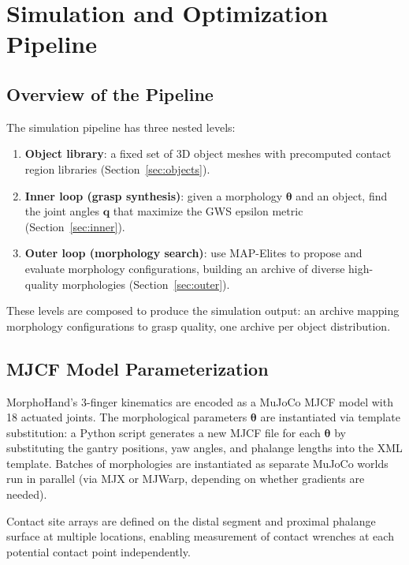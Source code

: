 \documentclass[journal]{IEEEtran}
\newcommand{\btheta}{\boldsymbol{\theta}}
\newcommand{\bq}{\mathbf{q}}
\begin{document}
\section{Simulation and Optimization Pipeline}
\label{sec:sim}

\subsection{Overview of the Pipeline}

The simulation pipeline has three nested levels:
\begin{enumerate}
  \item \textbf{Object library}: a fixed set of 3D object meshes with precomputed
    contact region libraries (Section~\ref{sec:objects}).
  \item \textbf{Inner loop (grasp synthesis)}: given a morphology $\btheta$ and an object,
    find the joint angles $\bq$ that maximize the GWS epsilon metric
    (Section~\ref{sec:inner}).
  \item \textbf{Outer loop (morphology search)}: use MAP-Elites to propose and evaluate
    morphology configurations, building an archive of diverse high-quality morphologies
    (Section~\ref{sec:outer}).
\end{enumerate}
These levels are composed to produce the simulation output: an archive mapping
morphology configurations to grasp quality, one archive per object distribution.

\subsection{MJCF Model Parameterization}

MorphoHand's 3-finger kinematics are encoded as a MuJoCo MJCF model with 18 actuated
joints.
The morphological parameters $\btheta$ are instantiated via template substitution:
a Python script generates a new MJCF file for each $\btheta$ by substituting the
gantry positions, yaw angles, and phalange lengths into the XML template.
Batches of morphologies are instantiated as separate MuJoCo worlds run in parallel
(via MJX or MJWarp, depending on whether gradients are needed).

Contact site arrays are defined on the distal segment and proximal phalange surface
at multiple locations, enabling measurement of contact wrenches at each potential
contact point independently.
\end{document}
